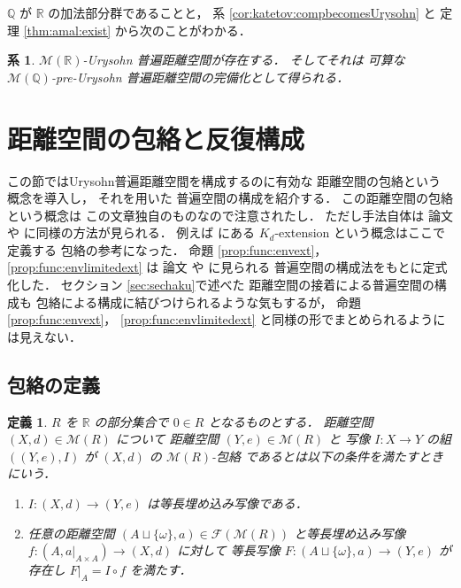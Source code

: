 \documentclass[leqno, 12pt]{jsarticle}
\newtheorem{cor}[thm]{系}
\newtheorem{df}[thm]{定義}
\renewcommand{\qq}{\mathbb{Q}}
\newcommand{\rr}{\mathbb{R}}
\newcommand{\Met}[1]{\mathscr{M}(#1)}
\newcommand{\FinitePart}[1]{\mathscr{F}(#1)}
\newcommand{\FinMet}[1]{\FinitePart{\Met{#1}}}
\newcommand{\restr}[2]{#1|_{#2}}
\begin{document}
$\qq$
が
$\rr$
の加法部分群であることと，
系
\ref{cor:katetov:compbecomesUrysohn}
と
定理
\ref{thm:amal:exist}
から次のことがわかる．
\begin{cor}\label{cor:amal:existUrysohn}
$\Met{\rr}$-Urysohn
普遍距離空間が存在する．%
そしてそれは
可算な
$\Met{\qq}$-pre-Urysohn
普遍距離空間の完備化として得られる．
\end{cor}



\newpage
\section{距離空間の包絡と反復構成}\label{sec:houraku}
この節ではUrysohn普遍距離空間を構成するのに有効な
距離空間の包絡という概念を導入し，
それを用いた
普遍空間の構成を紹介する．
この距離空間の包絡という概念は
この文章独自のものなので注意されたし．
ただし手法自体は
論文
\cite{Ka}
や
\cite{Greenbook}
に同様の方法が見られる．
例えば
\cite{Greenbook}
にある
$K_{d}$-extension
という概念はここで定義する
包絡の参考になった．
命題
\ref{prop:func:envext}，
\ref{prop:func:envlimitedext}
は
論文
\cite{Ka}
や
\cite{Greenbook}
に見られる
普遍空間の構成法をもとに定式化した．
セクション
 \ref{sec:sechaku}で述べた
距離空間の接着による普遍空間の構成も
包絡による構成に結びつけられるような気もするが，
命題
\ref{prop:func:envext}，
\ref{prop:func:envlimitedext}
と同様の形でまとめられるようには見えない．


\subsection{包絡の定義}\label{subsec:envelope:definition}

\begin{df}\label{df:func:envelope}
$R$
を
$\rr$
の部分集合で
$0\in R$
となるものとする．
距離空間
$(X, d)\in \Met{R}$
について
距離空間
$(Y, e)\in \Met{R}$
と
写像
$I\colon  X\to Y$
の組
$((Y, e), I)$
が
$(X, d)$%
の%
$\Met{R}$-包絡
であるとは以下の条件を満たすときにいう．
\begin{enumerate}[label=\textup{(\arabic*)}]
\item
$I\colon  (X, d)\to (Y, e)$
は等長埋め込み写像である．
\item
任意の距離空間
$(A\sqcup \{\omega\}, a)\in \FinMet{R}$
と等長埋め込み写像
$f\colon
\left(A,\restr{a}{A\times A}\right)\to (X, d)$
に対して
等長写像
$F\colon  (A\sqcup \{\omega\}, a)\to (Y, e)$
が存在し
$\restr{F}{A}=I\circ f$
を満たす．
\end{enumerate}
\end{df}
\end{document}
